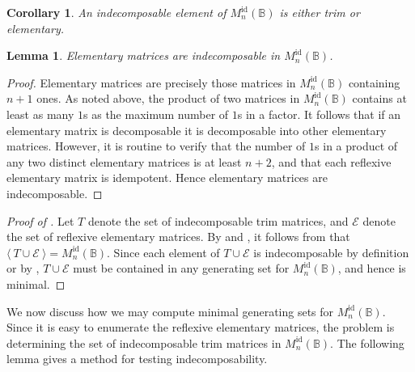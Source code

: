 \documentclass[11pt]{article}
\newtheorem{cor}[thm]{Corollary}
\newtheorem{lemma}[thm]{Lemma}
\numberwithin{equation}{section}
\newcommand{\genset}[1]{\ensuremath{\langle\: #1 \:\rangle}}
\newcommand{\B}{\mathbb{B}}
\newcommand{\Refln}{M_n^{\text{id}}(\B)}
\begin{document}
\begin{cor}
  An indecomposable element of $\Refln$ is either trim or elementary.
\end{cor}

\begin{lemma}
  Elementary matrices are indecomposable in $\Refln$.
\end{lemma}
\begin{proof}
  Elementary matrices are precisely those matrices in $\Refln$ containing $n + 1$
  ones. As noted above, the product of two matrices in $\Refln$ contains at least
  as many $1$s as the maximum number of $1$s in a factor. It follows that if an
  elementary matrix is decomposable it is decomposable into other elementary
  matrices. However, it is routine to verify that the number of $1$s in a
  product of any two distinct elementary matrices is at least $n + 2$, and that
  each reflexive elementary matrix is idempotent. Hence elementary matrices are
  indecomposable.
\end{proof}

\begin{proof}[Proof of ]
  Let $T$ denote the set of indecomposable trim matrices, and $\mathcal{E}$
  denote the set of reflexive elementary matrices. By
   and , it follows
  from  that $\genset{T \cup \mathcal{E}} =
  \Refln$. Since each element of $T \cup \mathcal{E}$ is indecomposable
  by definition or by ,
  $T \cup \mathcal{E}$ must be contained in any generating set for $\Refln$, and hence is
  minimal.
\end{proof}

We now discuss how we may compute minimal generating sets for $\Refln$. Since it
is easy to enumerate the reflexive elementary matrices, the problem is
determining the set of indecomposable trim matrices in $\Refln$. The following
lemma gives a method for testing indecomposability.
\end{document}
